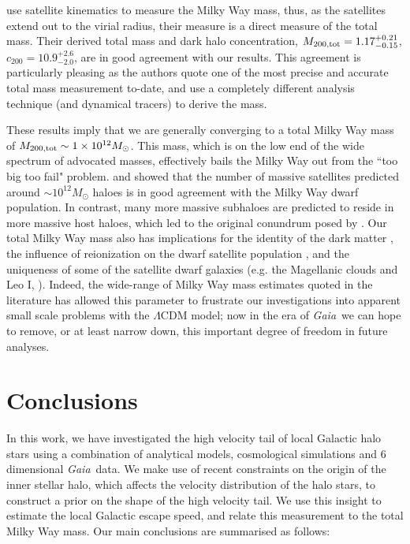 \documentclass[fleqn,usenatbib]{mnras}
\newcommand{\gaia}		{\emph{Gaia}}
\begin{document}
\cite{callingham19} use satellite kinematics to measure the Milky Way mass, thus, as the satellites extend out to the virial radius,  their measure is a direct measure of the total mass. Their derived total mass and dark halo concentration, $M_{200, \rm tot} = 1.17^{+0.21}_{-0.15}$, $c_{200} = 10.9^{+2.6}_{-2.0}$, are in good agreement with our results. This agreement is particularly pleasing as the authors quote one of the most precise and accurate total mass measurement to-date, and use a completely different analysis technique (and dynamical tracers) to derive the mass.

These results imply that we are generally converging to a total Milky Way mass of $M_{200, \rm tot} \sim 1 \times 10^{12} M_\odot$. This mass, which is on the low end of the wide spectrum of advocated masses, effectively bails the Milky Way out from the ``too big too fail" problem.  \cite{purcell12} and \cite{wang12} showed that the number of massive satellites predicted around $\sim 10^{12}M_\odot$ haloes is in good agreement with the Milky Way dwarf population. In contrast, many more massive subhaloes are predicted to reside in more massive host haloes, which led to the original conundrum posed by \cite{boylan12}. Our total Milky Way mass also has implications for the identity of the dark matter \citep[e.g.][]{kennedy14, lovell14}, the influence of reionization on the dwarf satellite population \citep{bose18}, and the uniqueness of some of the satellite dwarf galaxies (e.g. the Magellanic clouds and Leo I, \citealt{boylan13, cautun14}). Indeed, the wide-range of Milky Way mass estimates quoted in the literature has allowed this parameter to frustrate our investigations into apparent small scale problems with the $\Lambda$CDM model; now in the era of \gaia\ we can hope to remove, or at least narrow down, this important degree of freedom in future analyses.

\section{Conclusions}
\label{sec:conc}

In this work, we have investigated the high velocity tail of local Galactic halo stars using a combination of analytical models, cosmological simulations and 6 dimensional \gaia\ data. We make use of recent constraints on the origin of the inner stellar halo, which affects the velocity distribution of the halo stars, to construct a prior on the shape of the high velocity tail. We use this insight to estimate the local Galactic escape speed, and relate this measurement to the total Milky Way mass. Our main conclusions are summarised as follows:
\end{document}
